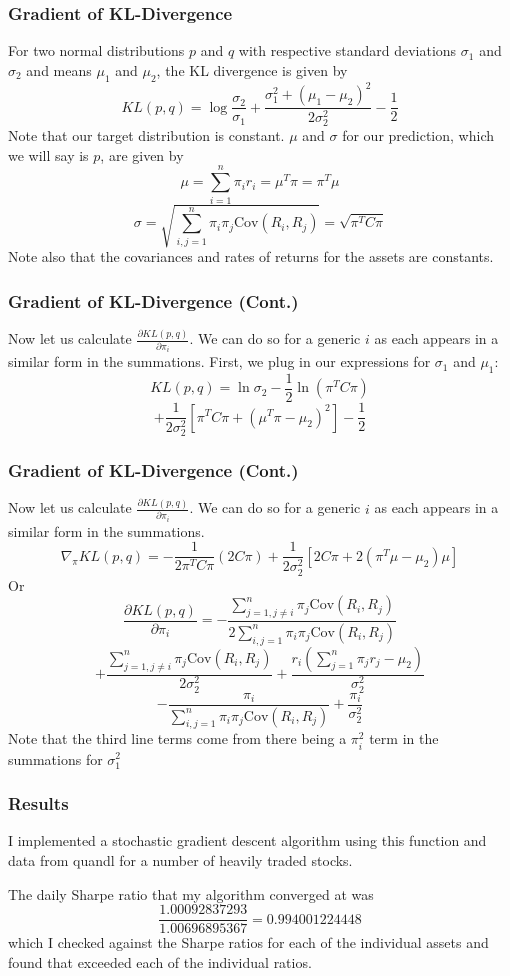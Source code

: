 \documentclass{beamer}
\begin{document}
\begin{frame}
\frametitle{Gradient of KL-Divergence}
For two normal distributions $p$ and $q$ with respective standard deviations $\sigma_1$ and $\sigma_2$ and means $\mu_1$ and $\mu_2$, the KL divergence is given by 
\[KL(p,q) = \log\frac{\sigma_2}{\sigma_1} + \frac{\sigma_1^2 + (\mu_1 - \mu_2)^2}{2\sigma_2^2} - \frac{1}{2}\]
Note that our target distribution is constant.  $\mu$ and $\sigma$ for our prediction, which we will say is $p$, are given by
\[\mu = \sum_{i=1}^n \pi_i r_i = \mu^T \pi = \pi^T \mu\]
\[\sigma = \sqrt{\sum_{i,j=1}^n \pi_i \pi_j \text{Cov} (R_i, R_j)} = \sqrt{\pi^T C\pi}\]
Note also that the covariances and rates of returns for the assets are constants.
\end{frame}

\begin{frame}
\frametitle{Gradient of KL-Divergence (Cont.)}
Now let us calculate $\frac{\partial KL(p,q)}{\partial \pi_i}$.  We can do so for a generic $i$ as each appears in a similar form in the summations.  First, we plug in our expressions for $\sigma_1$ and $\mu_1$:
\[KL(p,q) = \ln \sigma_2 - \frac{1}{2}\ln (\pi^T C \pi) \]\[ + \frac{1}{2\sigma_2^2}[\pi^TC\pi+ (\mu^T\pi- \mu_2)^2] - \frac{1}{2}\]

\end{frame}

\begin{frame}
\frametitle{Gradient of KL-Divergence (Cont.)}
Now let us calculate $\frac{\partial KL(p,q)}{\partial \pi_i}$.  We can do so for a generic $i$ as each appears in a similar form in the summations.
\[\nabla_\pi KL(p,q) = -\frac{1}{2 \pi^T C\pi} ( 2 C\pi ) + \frac{1}{2\sigma_2^2}[2 C\pi +2(\pi^T\mu- \mu_2)\mu] \]
Or
\[\frac{\partial KL(p,q)}{\partial \pi_i} =  - \frac{\sum_{j=1, j\neq i}^n \pi_j \text{Cov} (R_i, R_j)}{2\sum_{i,j=1}^n \pi_i \pi_j \text{Cov} (R_i, R_j)} \]
\[ + \frac{\sum_{j=1, j \neq i}^n \pi_j \text{Cov} (R_i, R_j)}{2\sigma_2^2} + \frac{r_i (\sum_{j=1}^n \pi_j r_j - \mu_2)}{\sigma_2^2} \]
\[- \frac{ \pi_i}{\sum_{i,j=1}^n \pi_i \pi_j \text{Cov} (R_i, R_j)} + \frac{\pi_i}{\sigma_2^2} \]
Note that the third line terms come from there being a $\pi_i^2$ term in the summations for $\sigma_1^2$
\end{frame}


\begin{frame}
\frametitle{Results}
I implemented a stochastic gradient descent algorithm using this function and data from quandl for a number of heavily traded stocks.

The daily Sharpe ratio that my algorithm converged at was 
\[\frac{1.00092837293}{1.00696895367} = 0.994001224448\]
which I checked against the Sharpe ratios for each of the individual assets and found that exceeded each of the individual ratios.
\end{frame}
\end{document}
